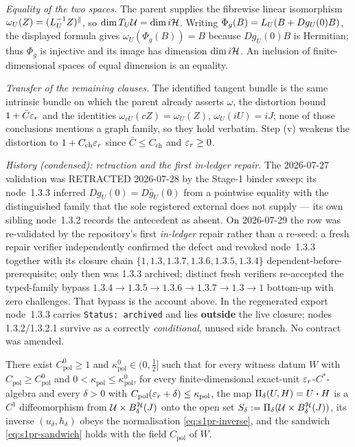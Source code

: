 \emph{Equality of the two spaces.} The parent supplies the fibrewise linear isomorphism
$\omega_U(Z)=(L_{U}^{-1}Z)^{\parallel}$, so $\dim T_U\mathcal U=\dim i\mathcal H$. Writing
$\Phi_g(B)=L_{U}(B+Dg_U(0)B)$, the displayed formula gives $\omega_U(\Phi_g(B))=B$
because $Dg_U(0)B$ is Hermitian; thus $\Phi_g$ is injective and its image has dimension
$\dim i\mathcal H$. An inclusion of finite-dimensional spaces of equal dimension is an equality.

\emph{Transfer of the remaining clauses.} The identified tangent bundle is the same
intrinsic bundle on which the parent already asserts $\omega$, the distortion bound
$1+\bar C\varepsilon_r$ and the identities $\omega_{cU}(cZ)=\omega_U(Z)$, $\omega_U(iU)=iJ$; none
of those conclusions mentions a graph family, so they hold verbatim. Step (v) weakens the
distortion to $1+C_{\mathrm{ch}}\varepsilon_r$ since $\bar C\le C_{\mathrm{ch}}$ and $\varepsilon_r\ge0$.

\noindent\emph{History (condensed): retraction and the first in-ledger repair.} The
2026-07-27 validation was RETRACTED 2026-07-28 by the Stage-1 binder sweep: its node~1.3.3
inferred $Dg_U(0)=D\bar g_U(0)$ from a pointwise equality with the distinguished family
that the sole registered external does not supply --- its own sibling node~1.3.2 records
the antecedent as absent. On 2026-07-29 the row was re-validated by the repository's first
\emph{in-ledger} repair rather than a re-seed: a fresh repair verifier independently
confirmed the defect and revoked node~1.3.3 together with its closure chain
$\{1,1.3,1.3.7,1.3.6,1.3.5,1.3.4\}$ dependent-before-prerequisite; only then was 1.3.3
archived; distinct fresh verifiers re-accepted the typed-family bypass
$1.3.4\to1.3.5\to1.3.6\to1.3.7\to1.3\to1$ bottom-up with zero challenges. That bypass is
the account above. In the regenerated export node~1.3.3 carries \texttt{Status: archived}
and lies \textbf{outside} the live closure; nodes 1.3.2/1.3.2.1 survive as a correctly
\emph{conditional}, unused side branch. No contract was amended.

\begin{lemma}\label{lem:stage1-polar-retraction-transport}
There exist $C^{0}_{\mathrm{pol}}\ge1$ and $\kappa^{0}_{\mathrm{pol}}\in(0,\tfrac12]$ such
that for every witness datum $W$ with $C_{\mathrm{pol}}\ge C^{0}_{\mathrm{pol}}$ and
$0<\kappa_{\mathrm{pol}}\le\kappa^{0}_{\mathrm{pol}}$, for every finite-dimensional
exact-unit $\varepsilon_r$-$C^*$-algebra and every $\delta>0$ with
$C_{\mathrm{pol}}(\varepsilon_r+\delta)\le\kappa_{\mathrm{pol}}$, the map
$\Pi_\delta(U,H)=U\mathbin{\bm{\cdot}} H$ is a $C^{1}$ diffeomorphism from $\mathcal U\times B^{\mathcal H}_{\delta}(J)$
onto the open set $S_\delta:=\Pi_\delta(\mathcal U\times B^{\mathcal H}_{\delta}(J))$, its inverse
$(u_\delta,h_\delta)$ obeys the normalisation \eqref{eq:s1pr-inverse}, and the sandwich
\eqref{eq:s1pr-sandwich} holds with the field $C_{\mathrm{pol}}$ of $W$.
\end{lemma}

